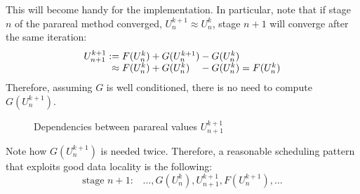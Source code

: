 This will become handy for the implementation.
In particular, note that if stage $n$ of the parareal method converged,
\ie $U^{k+1}_n \approx U^k_n$,
stage $n+1$ will converge after the same iteration:
\begin{equation}
  \begin{array}{r@{}l@{}l@{}l}
    U^{k+1}_{n+1}
    :={}      & F(U^k_n) &{}+ G(U^{k+1}_n) &{}- G(U^k_n) \\
    \approx{} & F(U^k_n) &{}+ G(U^k_n)     &{}- G(U^k_n)
    = F(U^k_n)
  \end{array}
\end{equation}
Therefore,
assuming $G$ is well conditioned,
there is no need to compute $G(U^{k+1}_n)$.

\begin{figure}[t]
  \centering
  
  \caption{Dependencies between parareal values $U^{k+1}_{n+1}$}
  \label{fig:pr:DAG}
\end{figure}


Note how $G(U_n^{k+1})$ is needed twice.
Therefore, a reasonable scheduling pattern that exploits good data locality is the following:
\begin{equation}
  \text{stage $n+1$:}
  \quad
  \ldots, G(U_n^k), U_{n+1}^{k+1}, F(U_n^{k+1}), \ldots
\end{equation}

